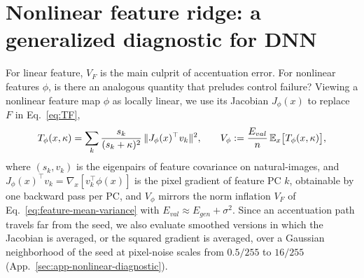 \vspace{-7pt}
\section{Nonlinear feature ridge: a generalized diagnostic for DNN}
\label{sec:nonlinear}
For linear feature,  $V_F$ is the main culprit of accentuation error. For nonlinear features $\phi$, is there an analogous quantity that preludes control failure?
Viewing a nonlinear feature map $\phi$ as locally linear, we use its Jacobian $J_\phi(x)$ to replace $F$ in Eq.~\ref{eq:TF},
\begin{equation}\small
T_\phi(x,\kappa)=\sum_k\frac{s_k}{(s_k+\kappa)^2}\,\|J_\phi(x)^\top v_k\|^2,
\qquad
V_\phi:=\frac{E_{val}}{n}\,\mathbb{E}_x\big[T_\phi(x,\kappa)\big],
\label{eq:Tphi}
\end{equation}
where $(s_k,v_k)$ is the eigenpairs of feature covariance on natural-images, and $J_\phi(x)^\top v_k=\nabla_x[v_k^\top\phi(x)]$ is the pixel gradient of feature PC $k$, obtainable by one backward pass per PC, and $V_\phi$ mirrors the norm inflation $V_F$ of Eq.~\ref{eq:feature-mean-variance} with $E_{val}\approx E_{gen}+\sigma^2$.
Since an accentuation path travels far from the seed, we also evaluate smoothed versions in which the Jacobian is averaged, or the squared gradient is averaged, over a Gaussian neighborhood of the seed at pixel-noise scales from $0.5/255$ to $16/255$ (App.~\ref{sec:app-nonlinear-diagnostic}).

